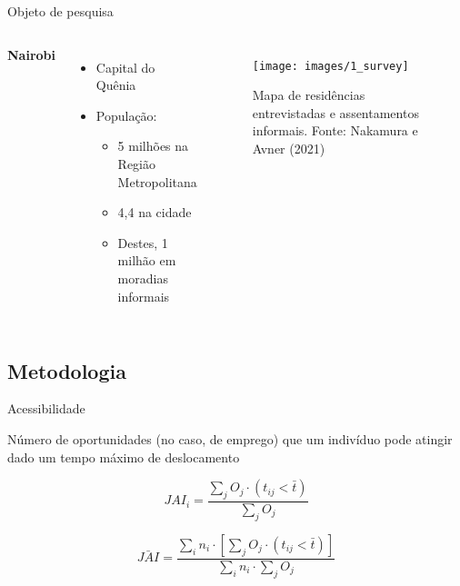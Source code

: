 \documentclass[
  ignorenonframetext,
  aspectratio=169]{beamer}
\begin{document}
\begin{frame}{Objeto de pesquisa}
\protect\hypertarget{objeto-de-pesquisa}{}
\begin{columns}


\textbf{Nairobi}

\begin{itemize}
  \item{Capital do Quênia}
  \item{População:}
    \begin{itemize}
      \item{5 milhões na Região Metropolitana}
      \item{4,4 na cidade}
      \item{Destes, 1 milhão em moradias informais}
    \end{itemize}
\end{itemize}

\begin{figure}

{\centering \texttt{[image: images/1\_survey]} 

}

\caption{\label{fig:survey1} Mapa de residências entrevistadas e assentamentos informais. Fonte: Nakamura e Avner (2021)}\label{fig:survey}
\end{figure}
\end{columns}
\end{frame}

\hypertarget{metodologia}{%
\subsection{Metodologia}\label{metodologia}}

\begin{frame}{Acessibilidade}
\protect\hypertarget{acessibilidade}{}
\begin{definition}
Número de oportunidades (no caso, de emprego) que um indivíduo pode atingir dado um tempo máximo de deslocamento 
\end{definition}

\begin{equation}
JAI_i = \frac{\sum_j O_j \cdot (t_{ij} < \bar{t})}{\sum_j O_j}
\end{equation}

\begin{equation}
\bar{JAI} = \frac{\sum_i n_i \cdot [\sum_j O_j \cdot (t_{ij} < \bar{t})]}{\sum_i n_i \cdot \sum_j O_j}
\end{equation}
\end{frame}
\end{document}
